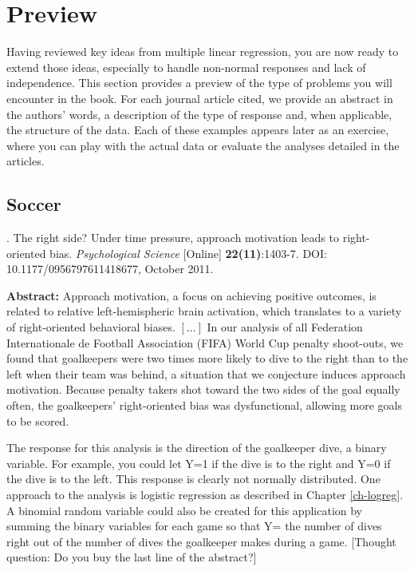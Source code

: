 \documentclass[
]{krantz}
\renewenvironment{quote}{\begin{VF}}{\end{VF}}
\begin{document}
\hypertarget{preview}{%
\section{Preview}\label{preview}}

Having reviewed key ideas from multiple linear regression, you are now ready to extend those ideas, especially to handle non-normal responses and lack of independence. This section provides a preview of the type of problems you will encounter in the book. For each journal article cited, we provide an abstract in the authors' words, a description of the type of response and, when applicable, the structure of the data. Each of these examples appears later as an exercise, where you can play with the actual data or evaluate the analyses detailed in the articles.

\hypertarget{soccer}{%
\subsection{Soccer}\label{soccer}}

\citet{Roskes2011} . The right side? Under time pressure, approach motivation leads to right-oriented bias. \emph{Psychological Science} {[}Online{]} \textbf{22(11)}:1403-7. DOI: 10.1177/0956797611418677, October 2011.

\begin{quote}
\textbf{Abstract:} Approach motivation, a focus on achieving positive outcomes, is related to relative left-hemispheric brain activation, which translates to a variety of right-oriented behavioral biases. \([\ldots]\) In our analysis of all Federation Internationale de Football Association (FIFA) World Cup penalty shoot-outs, we found that goalkeepers were two times more likely to dive to the right than to the left when their team was behind, a situation that we conjecture induces approach motivation. Because penalty takers shot toward the two sides of the goal equally often, the goalkeepers' right-oriented bias was dysfunctional, allowing more goals to be scored.
\end{quote}

The response for this analysis is the direction of the goalkeeper dive, a binary variable. For example, you could let Y=1 if the dive is to the right and Y=0 if the dive is to the left. This response is clearly not normally distributed. One approach to the analysis is logistic regression as described in Chapter \ref{ch-logreg}. A binomial random variable could also be created for this application by summing the binary variables for each game so that Y= the number of dives right out of the number of dives the goalkeeper makes during a game. {[}Thought question: Do you buy the last line of the abstract?{]}
\end{document}
